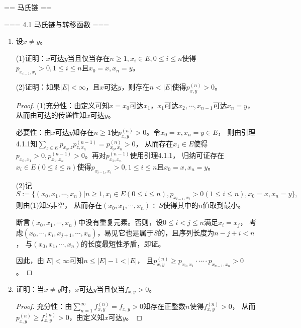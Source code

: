 == 马氏链 ==

=== 4.1 马氏链与转移函数 ===
\begin{enumerate}
    \item[4.1.4] 设$x\neq y$。

    (1)证明：$x$可达$y$当且仅当存在$n\geqslant1,x_i\in E,0\leqslant i\leqslant n$使得
    $p_{x_{i-1},x_i}>0,1\leqslant i\leqslant n$且$x_0=x,x_n=y$。

    (2)证明：如果$|E|<\infty$，且$x$可达$y$，则存在$n<|E|$使得$p_{x,y}^{(n)}>0$。
    \begin{proof}
        (1)充分性：由定义可知$x=x_0$可达$x_1$，$x_1$可达$x_2,\cdots,x_{n-1}$可达$x_n=y$，从而由可达的传递性知$x$可达$y$。

        必要性：由$x$可达$y$知存在$n\geqslant1$使$p_{x,y}^{(n)}>0$。令$x_0=x,x_n=y\in E$，
        则由引理4.1.1知$\sum\limits_{z\in E}p_{x_0,z}p_{z,x_n}^{(n-1)}=p_{x_0,x_n}^{(n)}>0$，
        从而存在$x_1\in E$使得$p_{x_0,x_1}>0,p_{x_1,x_n}^{(n-1)}>0$。再对$p_{x_1,x_n}^{(n-1)}$使用引理4.1.1，
        归纳可证存在$x_i\in E(0\leqslant i\leqslant n)$使得$p_{x_{i-1},x_i}>0,1\leqslant i\leqslant n$且$x_0=x,x_n=y$。

        (2)记\[S:=\{(x_0,x_1,\cdots,x_n)|n\geqslant1,x_i\in E(0\leqslant i\leqslant n),
        p_{x_{i-1},x_i}>0(1\leqslant i\leqslant n),x_0=x,x_n=y\},\]则由(1)知$S$非空，
        从而存在$(x_0,x_1,\cdots,x_n)\in S$使得其中的$n$值取到最小。

        断言$(x_0,x_1,\cdots,x_n)$中没有重复元素。否则，设$0\leqslant i<j\leqslant n$满足$x_i=x_j$，
        考虑$(x_0,\cdots,x_i,x_{j+1},\cdots,x_n)$，易见它也是属于$S$的，且序列长度为$n-j+i<n$，
        与$(x_0,x_1,\cdots,x_n)$的长度最短性矛盾，即证。

        因此，由$|E|<\infty$可知$n\leqslant|E|-1<|E|$，
        且$p_{x,y}^{(n)}\geqslant p_{x_0,x_1}\cdot\cdots\cdot p_{x_{n-1},x_n}>0$。
    \end{proof}
    \item[4.1.5] 证明：当$x\neq y$时，$x$可达$y$当且仅当$f_{x,y}>0$。
    \begin{proof}
        充分性：由$\sum\limits_{n=1}^\infty f_{x,y}^{(n)}=f_{x,y}>0$知存在正整数$n$使得$f_{x,y}^{(n)}>0$，
        从而$p_{x,y}^{(n)}\geqslant f_{x,y}^{(n)}>0$，由定义知$x$可达$y$。


\end{proof}
\end{enumerate}
